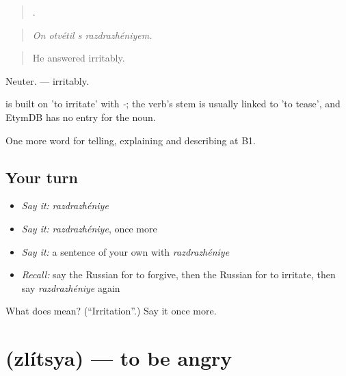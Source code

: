 \begin{quote}
   .
\end{quote}

\begin{quote}
\emph{On otvétil s razdrazhéniyem.}
\end{quote}

\begin{quote}
He answered irritably.
\end{quote}

Neuter. \emph{ } — irritably.

\begin{cousinweb}
\emph{} is built on \emph{} 'to irritate' with \emph{-}; the verb's stem is usually linked to \emph{} 'to tease', and EtymDB has no entry for the noun.
\end{cousinweb}

\begin{grammarlens}[title={What you've built}]
One more word for telling, explaining and describing at B1.
\end{grammarlens}

\subsection*{Your turn}
\begin{itemize}
\raggedright
  \item \emph{Say it:} \emph{razdrazhéniye}
  \item \emph{Say it:} \emph{razdrazhéniye}, once more
  \item \emph{Say it:} a sentence of your own with \emph{razdrazhéniye}
  \item \emph{Recall:} say the Russian for to forgive, then the Russian for to irritate, then say \emph{razdrazhéniye} again
\end{itemize}

\begin{tcolorbox}[breakable,colback=teal!4,colframe=teal!35!black,title={Before you move on}]
What does  mean? (\textquotedblleft{}Irritation\textquotedblright{}.) Say it once more.
\end{tcolorbox}
\section[\texorpdfstring{\ru{злиться} (zlítsya)}{злиться (zlítsya)}]{ (zlítsya) — to be angry}

